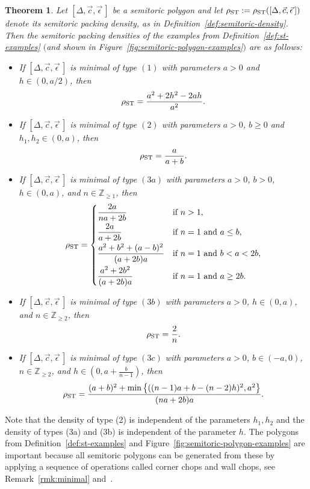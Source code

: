 \documentclass[10pt,a4paper]{amsart}
\numberwithin{equation}{section}
\newtheorem{Theorem}{Theorem}[section]
\def\Z{{\mathbb Z}}
\newcommand{\De}{\Delta}
\newcommand{\stpoly}{[\De,\vec{c},\vec{\epsilon}\,]}
\theoremstyle{definition}
\theoremstyle{plain}
\theoremstyle{plain}
\begin{document}
\begin{Theorem}\label{thm:semitoric-examples}
 Let $\stpoly$ be a semitoric polygon and let $\rho_{{\rm ST}}:=\rho_{{\rm ST}}(\stpoly)$ denote its semitoric packing density, as in Definition~{\rm \ref{def:semitoric-density}}.
 Then the semitoric packing densities of the examples from Definition~{\rm \ref{def:st-examples}} $($and shown in Figure~{\rm \ref{fig:semitoric-polygon-examples}}$)$ are as follows:
 \begin{itemize}\itemsep=0pt
 \item If $\stpoly$ is minimal of type $(1)$ with parameters $a>0$ and $h\in(0, a/2)$, then
 \[
 \rho_{{\rm ST}} = \frac{a^2+2h^2-2ah}{a^2}.
 \]
 \item If $\stpoly$ is minimal of type $(2)$ with parameters $a>0$, $b\geq 0$ and $h_1,h_2\in(0,a)$, then
 \[
 \rho_{{\rm ST}} = \frac{a}{a+b}.
 \]
 \item If $\stpoly$ is minimal of type $(3a)$ with parameters $a>0$, $b>0$, $h\in(0, a)$, and $n\in\Z_{\geq 1}$, then
 \begin{equation*}
 \rho_{{\rm ST}} = \begin{cases}
 \dfrac{2a}{na+2b} & \text{if }n>1,\vspace{1mm}\\
 \dfrac{2a}{a+2b} & \text{if }n=1 \text{ and }a\leq b,\vspace{1mm}\\
 \dfrac{a^2+b^2+ (a-b)^2}{(a+2b)a} & \text{if }n=1 \text{ and } b < a < 2b,\vspace{1mm}\\
 \dfrac{a^2+2b^2}{(a+2b)a} & \text{if }n=1 \text{ and } a \geq 2b. \end{cases}
 \end{equation*}
 \item If $\stpoly$ is minimal of type $(3b)$ with parameters $a>0$, $h \in (0,a)$, and $n\in\Z_{\geq 2}$, then
 \[
 \rho_{{\rm ST}} = \frac{2}{n}.
 \]
 \item If $\stpoly$ is minimal of type $(3c)$ with parameters $a>0$, $b\in (-a,0)$, $n\in\Z_{\geq 2}$, and $h\in (0,a+\frac{b}{n-1})$, then
 \[
 \rho_{{\rm ST}} = \frac{(a+b)^2+\min\big\{ ((n-1)a+b - (n-2)h )^2,a^2\big\}}{(na+2b)a}.
 \]
 \end{itemize}
\end{Theorem}

Note that the density of type (2) is independent of the parameters $h_1,h_2$ and the density of types (3a) and (3b) is independent of the parameter $h$.
The polygons from Definition~\ref{def:st-examples} and Figure~\ref{fig:semitoric-polygon-examples} are important because all semitoric polygons can be generated from these by applying a sequence of operations called corner chops and wall chops, see Remark~\ref{rmk:minimal} and~\cite{LFP-fam2}.
\end{document}
